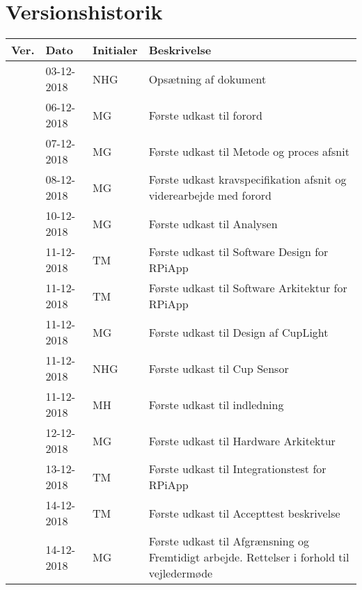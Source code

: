 \documentclass[Rapport/Rapport_main.tex]{subfiles}
\begin{document}
\section{Versionshistorik}
\begin{longtable}{|L{0.07\textwidth}|L{0.15\textwidth}|L{0.13\textwidth}|L{0.55\textwidth}|}
        \hline
        \textbf{Ver.} & \textbf{Dato} & \textbf{Initialer} & \textbf{Beskrivelse}  \\ \hline
        & 03-12-2018 & NHG & Opsætning af dokument \\ \hline
        & 06-12-2018 & MG & Første udkast til forord \\ \hline
        & 07-12-2018 & MG & Første udkast til Metode og proces afsnit \\ \hline
        & 08-12-2018 & MG & Første udkast kravspecifikation afsnit og viderearbejde med forord \\ \hline
        & 10-12-2018 & MG & Første udkast til Analysen \\ \hline
        & 11-12-2018 & TM & Første udkast til Software Design for RPiApp \\ \hline
        & 11-12-2018 & TM & Første udkast til Software Arkitektur for RPiApp \\ \hline 
        & 11-12-2018 & MG & Første udkast til Design af CupLight \\ \hline 
        & 11-12-2018 & NHG & Første udkast til Cup Sensor \\ \hline
        & 11-12-2018 & MH & Første udkast til indledning \\ \hline
        & 12-12-2018 & MG & Første udkast til Hardware Arkitektur \\ \hline
        & 13-12-2018 & TM & Første udkast til Integrationstest for RPiApp \\\hline
        & 14-12-2018 & TM & Første udkast til Accepttest beskrivelse \\ \hline
        & 14-12-2018 & MG & Første udkast til Afgrænsning og Fremtidigt arbejde. Rettelser i forhold til vejledermøde \\ \hline
\end{longtable}
\end{document}
